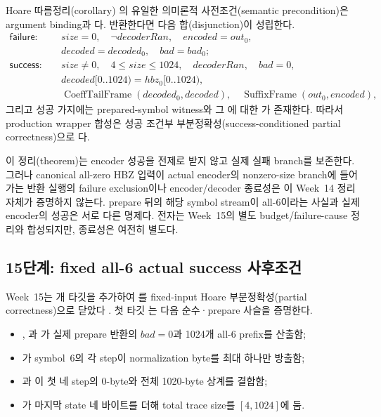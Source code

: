 \begin{verified}
Hoare 따름정리(corollary)
의 유일한 의미론적
사전조건(semantic precondition)은 argument binding과
다. 반환한다면 다음 합(disjunction)이 성립한다.
\[
\begin{aligned}
\mathsf{failure}:\quad
  &size=0,\quad \neg decoderRan,\quad encoded=out_0,\\
  &decoded=decoded_0,\quad bad=bad_0;\\[0.3em]
\mathsf{success}:\quad
  &size\ne0,\quad 4\le size\le1024,\quad decoderRan,\quad bad=0,\\
  &decoded[0..1024)=hbz_0[0..1024),\\
  &\operatorname{CoeffTailFrame}(decoded_0,decoded),\quad
    \operatorname{SuffixFrame}(out_0,encoded),
\end{aligned}
\]
그리고 성공 가지에는 prepared-symbol witness와 그
에 대한 가 존재한다.
따라서 production wrapper 합성은 성공 조건부 부분정확성(success-conditioned
partial correctness)으로 \statusproved 다.
\end{verified}

이 정리(theorem)는 encoder 성공을 전제로 받지 않고 실제 실패 branch를 보존한다.
그러나 canonical all-zero HBZ 입력이 actual encoder의 nonzero-size branch에
들어가는 반환 실행의 failure exclusion이나 encoder/decoder 종료성은 이
Week~14 정리 자체가 증명하지 않는다. prepare 뒤의 해당 symbol stream이
all-6이라는 사실과 실제 encoder의 성공은 서로 다른 명제다. 전자는
Week~15의 별도 budget/failure-cause 정리와 합성되지만, 종료성은 여전히 별도다.

\subsection{15단계: fixed all-6 actual success 사후조건}

Week~15는 \WeekFifteenTargetCount 개 타깃을 추가하여
를 fixed-input Hoare
부분정확성(partial correctness)으로 닫았다
\cite{week15-report,rans-actual-success-witness}. 첫 타깃
는 다음 순수·prepare 사슬을 증명한다.

\begin{itemize}
  \item {}, 과
        가 실제 prepare 반환의
        \(bad=0\)과 1024개 all-6 prefix를 산출함;
  \item {}가 symbol~6의 각 step이
        normalization byte를 최대 하나만 방출함;
  \item {}과
        이 첫 네 step의 0-byte와
        전체 1020-byte 상계를 결합함;
  \item {}가 마지막 state 네 바이트를 더해
        total trace size를 \([4,1024]\)에 둠.
\end{itemize}

